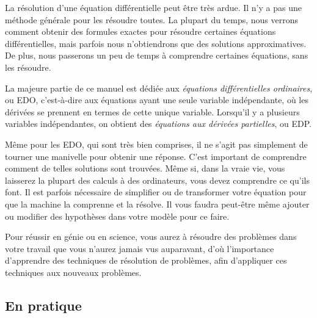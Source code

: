 La résolution d'une équation différentielle peut être très ardue.  Il n'y a pas une méthode générale pour les résoudre toutes.
La plupart du temps, nous verrons comment obtenir des formules exactes pour résoudre certaines équations différentielles,
mais parfois nous n'obtiendrons que des solutions approximatives. De plus, nous passerons un peu de temps à comprendre certaines équations, sans les résoudre.

La majeure partie de ce manuel est dédiée aux
\emph{équations différentielles ordinaires},
ou EDO, c'est-à-dire aux équations ayant une seule variable indépendante, où les dérivées se prennent en termes de cette unique variable.
Lorsqu'il y a plusieurs variables indépendantes, on obtient des
\emph{équations aux dérivées partielles},
ou EDP.

Même pour les EDO, qui sont très bien comprises, il ne s'agit pas simplement de tourner une manivelle pour obtenir une réponse.
C'est important de comprendre comment de telles solutions sont trouvées.
Même si, dans la vraie vie, vous laisserez la plupart des calculs à des ordinateurs, vous devez comprendre ce qu'ils font.
Il est parfois nécessaire de simplifier ou de transformer votre équation pour que la machine la comprenne et la résolve.
Il vous faudra peut-être même ajouter ou modifier des hypothèses dans votre modèle pour ce faire.

Pour réussir en génie ou en science, vous aurez à résoudre des problèmes dans votre travail que vous n'aurez jamais vus auparavant,
d'où l'importance d'apprendre des techniques de résolution de problèmes, afin d'appliquer ces techniques aux nouveaux problèmes.

\subsection{En pratique}
\begin{myfig}
\end{myfig}

